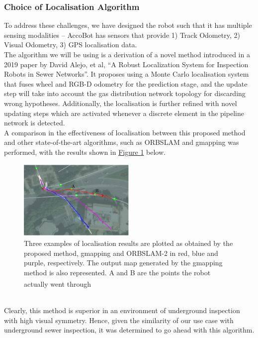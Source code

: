 \documentclass[11pt]{article}		%
\newcommand{\supercite}[1]{\textsuperscript{\cite{#1}}}		%
\newcommand{\figref}[1]{\hyperref[#1]{Figure \ref*{#1}}}    %
\begin{document}
		\subsubsection{Choice of Localisation Algorithm}
		To address these challenges, we have designed the robot such that it has multiple sensing modalities – AccoBot has sensors that provide 1) Track Odometry, 2) Visual Odometry, 3) GPS localisation data. 
        \\ \hspace*{3ex}The algorithm we will be using is a derivation of a novel method introduced in a 2019 paper by David Alejo, et al, “A Robust Localization System for Inspection Robots in Sewer Networks”. It proposes using a Monte Carlo localisation system that fuses wheel and RGB-D odometry for the prediction stage, and the update step will take into account the gas distribution network topology for discarding wrong hypotheses. Additionally, the localisation is further refined with novel updating steps which are activated whenever a discrete element in the pipeline network is detected.
        \\ \hspace*{3ex}A comparison in the effectiveness of localisation between this proposed method and other state-of-the-art algorithms, such as ORBSLAM and gmapping was performed, with the results shown in \figref{localisationExamples} below.
					\begin{figure}[h]
				\centering
				\includegraphics[width=0.5\textwidth]{localisationalgocomparison.jpg}
				\caption{Three examples of localisation results are plotted as obtained by the proposed method, gmapping and ORBSLAM-2 in red, blue and purple, respectively. The output map generated by the gmapping method is also represented. A and B are the points the robot actually went through\supercite{ELFTransmitter}}
				\label{localisationExamples}
			\end{figure}
		\\Clearly, this method is superior in an environment of underground inspection with high visual symmetry. Hence, given the similarity of our use case with underground sewer inspection, it was determined to go ahead with this algorithm.
	
\end{document}
